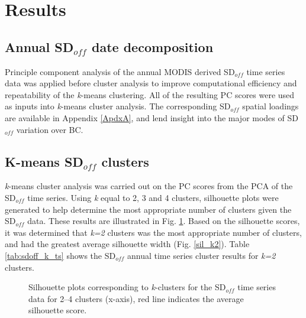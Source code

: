 \documentclass{tATO2e}
\newcommand{\sdoff}{SD$_{off}$}
\begin{document}
\section{Results}
\subsection{Annual \sdoff{} date decomposition}
Principle component analysis of the annual MODIS derived \sdoff{} time series data was applied before cluster analysis to improve computational efficiency and repeatability of the \textit{k}-means clustering. All of the resulting PC scores were used as inputs into \textit{k}-means cluster analysis. The corresponding \sdoff{} spatial loadings are available in Appendix \ref{ApdxA}, and lend insight into the major modes of \sdoff{} variation over BC.   

\subsection{K-means \sdoff{} clusters}

\textit{k}-means cluster analysis was carried out on the PC scores from the PCA of the \sdoff{} time series. Using \textit{k} equal to 2, 3 and 4 clusters, silhouette plots were generated to help determine the most appropriate number of clusters given the \sdoff{} data. These results are illustrated in Fig. \ref{fig:sillhouettes}. Based on the silhouette scores, it was determined that \textit{k=2} clusters was the most appropriate number of clusters, and had the greatest average silhouette width (Fig. \ref{sil_k2}). Table \ref{tab:sdoff_k_ts} shows the \sdoff{} annual time series cluster results for \textit{k=2} clusters. 


\begin{figure}[!h]
	\begin{center}
		\hspace{5pt}
		\hspace{5pt}
		\hspace{5pt}
		\caption{Silhouette plots corresponding to \textit{k}-clusters for the \sdoff{} time series data for 2--4 clusters (x-axis), red line indicates the average silhouette score.}
		\label{fig:sillhouettes}
	\end{center}
\end{figure}
\end{document}
